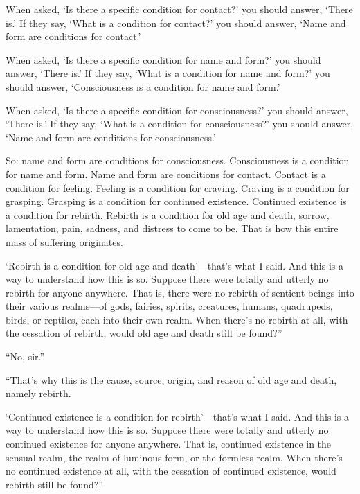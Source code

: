 \documentclass[12pt,openany]{book}%
\begin{document}
When asked, ‘Is there a specific condition for contact?’ you should answer, ‘There is.’ If they say, ‘What is a condition for contact?’ you should answer, ‘Name and form are conditions for contact.’ 

When asked, ‘Is there a specific condition for name and form?’ you should answer, ‘There is.’ If they say, ‘What is a condition for name and form?’ you should answer, ‘Consciousness is a condition for name and form.’ 

When asked, ‘Is there a specific condition for consciousness?’ you should answer, ‘There is.’ If they say, ‘What is a condition for consciousness?’ you should answer, ‘Name and form are conditions for consciousness.’ 

So: name and form are conditions for consciousness. Consciousness is a condition for name and form. Name and form are conditions for contact. Contact is a condition for feeling. Feeling is a condition for craving. Craving is a condition for grasping. Grasping is a condition for continued existence. Continued existence is a condition for rebirth. Rebirth is a condition for old age and death, sorrow, lamentation, pain, sadness, and distress to come to be. That is how this entire mass of suffering originates. 

‘Rebirth is a condition for old age and death’—that’s what I said. And this is a way to understand how this is so. Suppose there were totally and utterly no rebirth for anyone anywhere. That is, there were no rebirth of sentient beings into their various realms—of gods, fairies, spirits, creatures, humans, quadrupeds, birds, or reptiles, each into their own realm. When there’s no rebirth at all, with the cessation of rebirth, would old age and death still be found?” 

“No, sir.” 

“That’s why this is the cause, source, origin, and reason of old age and death, namely rebirth. 

‘Continued existence is a condition for rebirth’—that’s what I said. And this is a way to understand how this is so. Suppose there were totally and utterly no continued existence for anyone anywhere. That is, continued existence in the sensual realm, the realm of luminous form, or the formless realm. When there’s no continued existence at all, with the cessation of continued existence, would rebirth still be found?” 
\end{document}
